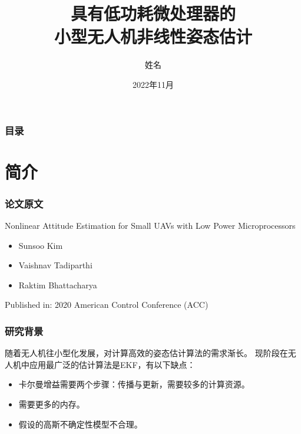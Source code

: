 \documentclass{beamer}
\title[无人机姿态估计] %
{具有低功耗微处理器的\\
	小型无人机非线性姿态估计}
\author[姓名] %
{姓名 }
\institute[SCUT] %
{
	华南理工大学 \\
	xxxx重点实验室\\
	广东省xxxx中心	
	
}
\date[2022年11月]%
{2022年11月}
\begin{document}

	\frame{\titlepage}
	
	\begin{frame}
		\frametitle{目录}
		\tableofcontents
	\end{frame}
	\section{简介}
	
	\begin{frame}
		\frametitle{论文原文}
		
		{\Large Nonlinear Attitude Estimation for Small UAVs with Low Power Microprocessors}
		 
		\begin{itemize}
			\item Sunsoo Kim
			\item Vaishnav Tadiparthi
			\item Raktim Bhattacharya
		\end{itemize}
		Published in: 2020 American Control Conference (ACC)
	\end{frame}

	\begin{frame}
		\frametitle{研究背景}
		
		随着无人机往小型化发展，对计算高效的姿态估计算法的需求渐长。
		现阶段在无人机中应用最广泛的估计算法是EKF，有以下缺点：
		\begin{itemize}
			\item 卡尔曼增益需要两个步骤：传播与更新，需要较多的计算资源。
			\item 需要更多的内存。
			\item 假设的高斯不确定性模型不合理。
		\end{itemize}

	\end{frame}


%		
%		
%		
	
\end{document}

